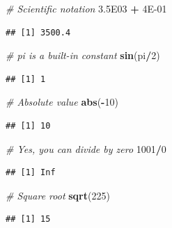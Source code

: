 \documentclass[]{book}
\newenvironment{Shaded}{\begin{snugshade}}{\end{snugshade}}
\newcommand{\CommentTok}[1]{\textcolor[rgb]{0.56,0.35,0.01}{\textit{#1}}}
\newcommand{\DecValTok}[1]{\textcolor[rgb]{0.00,0.00,0.81}{#1}}
\newcommand{\FloatTok}[1]{\textcolor[rgb]{0.00,0.00,0.81}{#1}}
\newcommand{\KeywordTok}[1]{\textcolor[rgb]{0.13,0.29,0.53}{\textbf{#1}}}
\newcommand{\NormalTok}[1]{#1}
\newcommand{\OperatorTok}[1]{\textcolor[rgb]{0.81,0.36,0.00}{\textbf{#1}}}
\newcommand{\StringTok}[1]{\textcolor[rgb]{0.31,0.60,0.02}{#1}}
\begin{document}
\begin{Shaded}
\begin{Highlighting}[]
\CommentTok{# Scientific notation}
\FloatTok{3.5E03} \OperatorTok{+}\StringTok{ }\FloatTok{4E-01}
\end{Highlighting}
\end{Shaded}

\begin{verbatim}
## [1] 3500.4
\end{verbatim}

\begin{Shaded}
\begin{Highlighting}[]
\CommentTok{# pi is a built-in constant}
\KeywordTok{sin}\NormalTok{(pi}\OperatorTok{/}\DecValTok{2}\NormalTok{)}
\end{Highlighting}
\end{Shaded}

\begin{verbatim}
## [1] 1
\end{verbatim}

\begin{Shaded}
\begin{Highlighting}[]
\CommentTok{# Absolute value}
\KeywordTok{abs}\NormalTok{(}\OperatorTok{-}\DecValTok{10}\NormalTok{)}
\end{Highlighting}
\end{Shaded}

\begin{verbatim}
## [1] 10
\end{verbatim}

\begin{Shaded}
\begin{Highlighting}[]
\CommentTok{# Yes, you can divide by zero}
\DecValTok{1001}\OperatorTok{/}\DecValTok{0}
\end{Highlighting}
\end{Shaded}

\begin{verbatim}
## [1] Inf
\end{verbatim}

\begin{Shaded}
\begin{Highlighting}[]
\CommentTok{# Square root}
\KeywordTok{sqrt}\NormalTok{(}\DecValTok{225}\NormalTok{)}
\end{Highlighting}
\end{Shaded}

\begin{verbatim}
## [1] 15
\end{verbatim}
\end{document}
